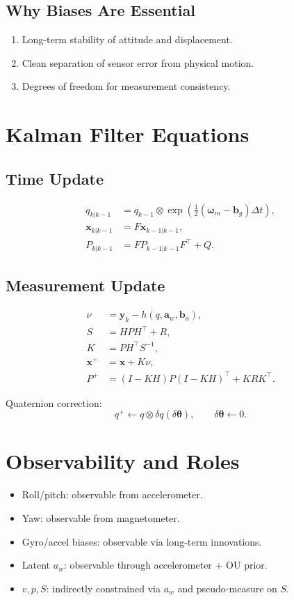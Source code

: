 \documentclass[11pt]{article}
\begin{document}
\subsection{Why Biases Are Essential}
\begin{enumerate}
\item Long-term stability of attitude and displacement.
\item Clean separation of sensor error from physical motion.
\item Degrees of freedom for measurement consistency.
\end{enumerate}

\section{Kalman Filter Equations}
\subsection{Time Update}
\[
\begin{aligned}
q_{k|k-1} &= q_{k-1}\otimes\exp\!\left(\tfrac{1}{2}(\bm\omega_m - \bm b_g)\Delta t\right), \\
\bm x_{k|k-1} &= F \bm x_{k-1|k-1}, \\
P_{k|k-1} &= F P_{k-1|k-1} F^\top + Q.
\end{aligned}
\]

\subsection{Measurement Update}
\[
\begin{aligned}
\nu &= \bm y_k - h(q,\bm a_w,\bm b_a),\\
S &= HPH^\top + R,\\
K &= PH^\top S^{-1},\\
\bm x^+ &= \bm x + K\nu, \\
P^+ &= (I-KH)P(I-KH)^\top + K R K^\top.
\end{aligned}
\]

Quaternion correction:
\[
q^+ \leftarrow q \otimes \delta q(\delta\bm\theta),\qquad
\delta\bm\theta\leftarrow 0.
\]

\section{Observability and Roles}
\begin{itemize}
\item Roll/pitch: observable from accelerometer.
\item Yaw: observable from magnetometer.
\item Gyro/accel biases: observable via long-term innovations.
\item Latent $a_w$: observable through accelerometer + OU prior.
\item $v,p,S$: indirectly constrained via $a_w$ and pseudo-measure on $S$.
\end{itemize}
\end{document}
